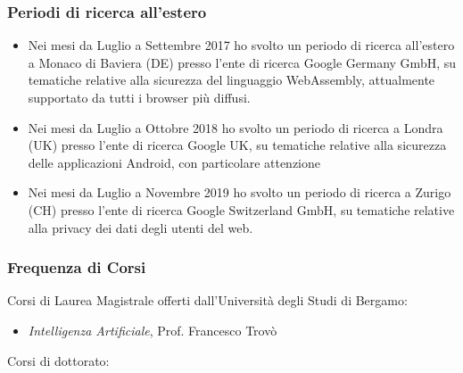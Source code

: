 \documentclass{article}
\begin{document}
\subsubsection*{Periodi di ricerca all'estero}

\begin{itemize}
	\item Nei mesi da Luglio a Settembre 2017 ho svolto un periodo di ricerca all'estero a Monaco di Baviera (DE) presso l'ente di ricerca Google Germany GmbH, su tematiche relative alla sicurezza del linguaggio WebAssembly, attualmente supportato da tutti i browser più diffusi.
	\item Nei mesi da Luglio a Ottobre 2018 ho svolto un periodo di ricerca a Londra (UK) presso l'ente di ricerca Google UK, su tematiche relative alla sicurezza delle applicazioni Android, con particolare attenzione
	\item Nei mesi da Luglio a Novembre 2019 ho svolto un periodo di ricerca a Zurigo (CH) presso l'ente di ricerca Google Switzerland GmbH, su tematiche relative alla privacy dei dati degli utenti del web.
\end{itemize}


\subsubsection*{Frequenza di Corsi}

\noindent Corsi di Laurea Magistrale offerti dall'Università degli Studi di Bergamo:

\begin{itemize}
	\item \textit{Intelligenza Artificiale}, Prof. Francesco Trovò
\end{itemize}

\smallskip
\noindent Corsi di dottorato:

\end{document}
